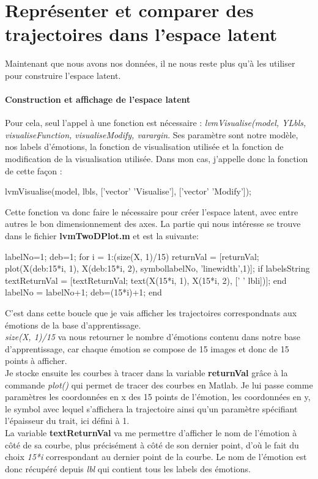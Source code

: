 \documentclass[poster]{polytech/polytech}
\begin{document}
\section{Représenter et comparer des trajectoires dans l'espace latent}
Maintenant que nous avons nos données, il ne nous reste plus qu'à les utiliser pour construire l'espace latent.

\paragraph{Construction et affichage de l'espace latent}
Pour cela, seul l'appel à une fonction est nécessaire : \textit{lvmVisualise(model, YLbls, visualiseFunction, visualiseModify, varargin}. Ses paramètre sont notre modèle, nos labels d'émotions, la fonction de visualisation utilisée et la fonction de modification de la visualisation utilisée. Dans mon cas, j'appelle donc la fonction de cette façon :
\begin{matlabsource}
lvmVisualise(model, lbls, ['vector' 'Visualise'], ['vector' 'Modify']);
\end{matlabsource}
Cette fonction va donc faire le nécessaire pour créer l'espace latent, avec entre autres le bon dimensionnement des axes. La partie qui nous intéresse se trouve dans le fichier \textbf{lvmTwoDPlot.m} et est la suivante:
\begin{matlabsource}
labelNo=1;
deb=1;
for i = 1:(size(X, 1)/15)
    returnVal = [returnVal; plot(X(deb:15*i, 1), X(deb:15*i, 2), symbol{labelNo}, 'linewidth',1)];
    if labelsString
        textReturnVal = [textReturnVal; text(X(15*i, 1), X(15*i, 2), ['   ' lbl{i}])];
    end
    labelNo = labelNo+1;
    deb=(15*i)+1;
end
\end{matlabsource}
C'est dans cette boucle que je vais afficher les trajectoires correspondnats aux émotions de la base d'apprentissage.\\
\textit{size(X, 1)/15} va nous retourner le nombre d'émotions contenu dans notre base d'apprentissage, car chaque émotion se compose de 15 images et donc de 15 points à afficher.\\
Je stocke ensuite les courbes à tracer dans la variable \textbf{returnVal} grâce à la commande \textit{plot()} qui permet de tracer des courbes en Matlab. Je lui passe comme paramètres les coordonnées en x des 15 points de l'émotion, les coordonnées en y, le symbol avec lequel s'affichera la trajectoire ainsi qu'un paramètre spécifiant l'épaisseur du trait, ici défini à 1.\\
La variable \textbf{textReturnVal} va me permettre d'afficher le nom de l'émotion à côté de sa courbe, plus précisément à côté de son dernier point, d'où le fait du choix \textit{15*i} correspondant au dernier point de la courbe. Le nom de l'émotion est donc récupéré depuis \textit{lbl} qui contient tous les labels des émotions.\\
\end{document}
